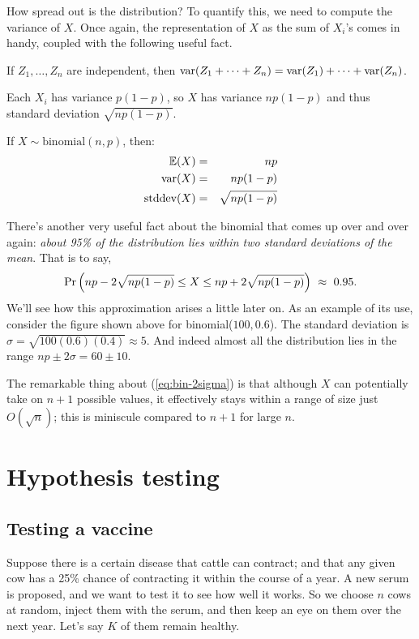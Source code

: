 How spread out is the distribution? To quantify this, we need to compute the 
variance of $X$. Once again, the representation of $X$ as the sum of $X_i$'s
comes in handy, coupled with the following useful fact.
\begin{fact}
If $Z_1, \ldots, Z_n$ are independent, then 
$\mbox{\rm var}(Z_1 + \cdots + Z_n) = \mbox{\rm var}(Z_1) + \cdots + \mbox{\rm var}(Z_n)$.
\end{fact}
\noindent
Each $X_i$ has variance $p(1-p)$, so $X$ has variance $np(1-p)$ 
and thus standard deviation $\sqrt{np(1-p)}$.
\begin{fact}
If $X \sim \mbox{binomial}(n,p)$, then:
\begin{eqnarray*}
\mathbb{E}(X) & = & np \\
\mbox{\rm var}(X) & = & np(1-p) \\
\mbox{\rm stddev}(X) & = & \sqrt{np(1-p)}
\end{eqnarray*}
\end{fact}

There's another very useful fact about the binomial that comes up over and over again:
{\it about 95\% of the distribution lies within two standard deviations of the mean}.
That is to say,
\begin{equation}
\mbox{\rm Pr} \left(np - 2 \sqrt{np(1-p)} \leq X \leq np + 2 \sqrt{np(1-p)}\right) 
\ \approx \ 0.95 . \label{eq:bin-2sigma}
\end{equation}
We'll see how this approximation arises a little later on. As an example of its use,
consider the figure shown above for binomial($100,0.6$). The standard deviation is 
$\sigma = \sqrt{100 (0.6) (0.4)} \approx 5$. And indeed almost all the 
distribution lies in the range $np \pm 2 \sigma = 60 \pm 10$.

The remarkable thing about (\ref{eq:bin-2sigma}) is that although $X$ can potentially
take on $n+1$ possible values, it effectively stays within a range of size just 
$O(\sqrt{n})$; this is miniscule compared to $n+1$ for large $n$.

\section{Hypothesis testing}

\subsection{Testing a vaccine}

Suppose there is a certain disease that cattle can contract; and that any given 
cow has a 25\% chance of contracting it within the course of a year. A new serum 
is proposed, and we want to test it to see how well it works. So we choose $n$ cows 
at random, inject them with the serum, and then keep an eye on them over the next 
year. Let's say $K$ of them remain healthy.

